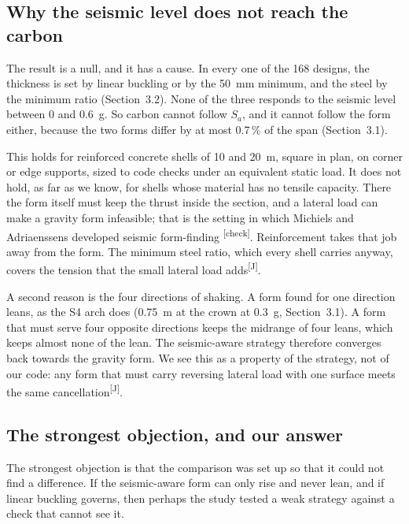 \documentclass[preprint,12pt]{elsarticle}
\newcommand{\chk}{\textsuperscript{\textcolor{markcol}{\sffamily\scriptsize[check]}}}
\newcommand{\jud}{\textsuperscript{\textcolor{markcol}{\sffamily\scriptsize[J]}}}
\newcommand{\chk}{}
\newcommand{\jud}{}
\begin{document}
\subsection{Why the seismic level does not reach the carbon}

The result is a null, and it has a cause. In every one of the 168 designs, the thickness is set by linear buckling or by the 50~mm minimum, and the steel by the minimum ratio (Section~3.2). None of the three responds to the seismic level between 0 and 0.6~g. So carbon cannot follow $S_a$, and it cannot follow the form either, because the two forms differ by at most 0.7\,\% of the span (Section~3.1).

This holds for reinforced concrete shells of 10 and 20~m, square in plan, on corner or edge supports, sized to code checks under an equivalent static load. It does not hold, as far as we know, for shells whose material has no tensile capacity. There the form itself must keep the thrust inside the section, and a lateral load can make a gravity form infeasible; that is the setting in which Michiels and Adriaenssens developed seismic form-finding \cite{Michiels2017IASS,Michiels2018CS}\chk. Reinforcement takes that job away from the form. The minimum steel ratio, which every shell carries anyway, covers the tension that the small lateral load adds\jud.

A second reason is the four directions of shaking. A form found for one direction leans, as the S4 arch does (0.75~m at the crown at 0.3~g, Section~3.1). A form that must serve four opposite directions keeps the midrange of four leans, which keeps almost none of the lean. The seismic-aware strategy therefore converges back towards the gravity form. We see this as a property of the strategy, not of our code: any form that must carry reversing lateral load with one surface meets the same cancellation\jud.

\subsection{The strongest objection, and our answer}

The strongest objection is that the comparison was set up so that it could not find a difference. If the seismic-aware form can only rise and never lean, and if linear buckling governs, then perhaps the study tested a weak strategy against a check that cannot see it.
\end{document}
